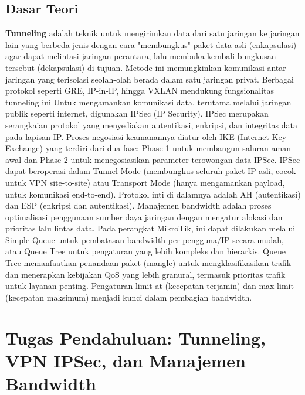 \subsection{Dasar Teori}
\textbf{Tunneling} adalah teknik untuk mengirimkan data dari satu jaringan ke jaringan lain yang berbeda jenis dengan cara "membungkus" paket data asli (enkapsulasi) agar dapat melintasi jaringan perantara, lalu membuka kembali bungkusan tersebut (dekapsulasi) di tujuan. Metode ini memungkinkan komunikasi antar jaringan yang terisolasi seolah-olah berada dalam satu jaringan privat. Berbagai protokol seperti GRE, IP-in-IP, hingga VXLAN mendukung fungsionalitas tunneling ini
Untuk mengamankan komunikasi data, terutama melalui jaringan publik seperti internet, digunakan IPSec (IP Security). IPSec merupakan serangkaian protokol yang menyediakan autentikasi, enkripsi, dan integritas data pada lapisan IP. Proses negosiasi keamanannya diatur oleh IKE (Internet Key Exchange) yang terdiri dari dua fase: Phase 1 untuk membangun saluran aman awal dan Phase 2 untuk menegosiasikan parameter terowongan data IPSec. IPSec dapat beroperasi dalam Tunnel Mode (membungkus seluruh paket IP asli, cocok untuk VPN site-to-site) atau Transport Mode (hanya mengamankan payload, untuk komunikasi end-to-end). Protokol inti di dalamnya adalah AH (autentikasi) dan ESP (enkripsi dan autentikasi).
Manajemen bandwidth adalah proses optimalisasi penggunaan sumber daya jaringan dengan mengatur alokasi dan prioritas lalu lintas data. Pada perangkat MikroTik, ini dapat dilakukan melalui Simple Queue untuk pembatasan bandwidth per pengguna/IP secara mudah, atau Queue Tree untuk pengaturan yang lebih kompleks dan hierarkis. Queue Tree memanfaatkan penandaan paket (mangle) untuk mengklasifikasikan trafik dan menerapkan kebijakan QoS yang lebih granural, termasuk prioritas trafik untuk layanan penting. Pengaturan limit-at (kecepatan terjamin) dan max-limit (kecepatan maksimum) menjadi kunci dalam pembagian bandwidth.



\section*{Tugas Pendahuluan: Tunneling, VPN IPSec, dan Manajemen Bandwidth}

